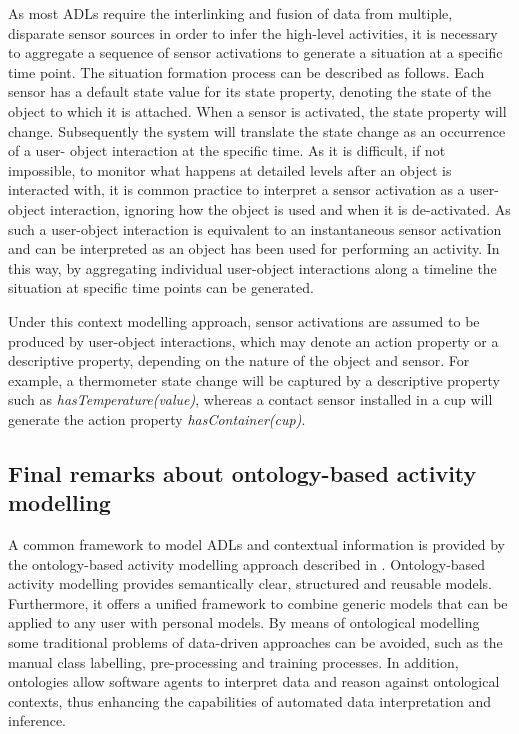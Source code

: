 As most ADLs require the interlinking and fusion of data from multiple, disparate sensor sources in order to infer the high-level activities, it is necessary to aggregate a sequence of sensor activations to generate a situation at a specific time point. The situation formation process can be described as follows. Each sensor has a default state value for its state property, denoting the state of the object to which it is attached. When a sensor is activated, the state property will change. Subsequently the system will translate the state change as an occurrence of a user- object interaction at the specific time. As it is difficult, if not impossible, to monitor what happens at detailed levels after an object is interacted with, it is common practice to interpret a sensor activation as a user-object interaction, ignoring how the object is used and when it is de-activated. As such a user-object interaction is equivalent to an instantaneous sensor activation and can be interpreted as an object has been used for performing an activity. In this way, by aggregating individual user-object interactions along a timeline the situation at specific time points can be generated. 

Under this context modelling approach, sensor activations are assumed to be produced by user-object interactions, which may denote an action property or a descriptive property, depending on the nature of the object and sensor. For example, a thermometer state change will be captured by a descriptive property such as \textit{hasTemperature(value)}, whereas a contact sensor installed in a cup will generate the action property \textit{hasContainer(cup)}. 

\subsection{Final remarks about ontology-based activity modelling}

A common framework to model ADLs and contextual information is provided by the ontology-based activity modelling approach described in \cite{Chen2012a}. Ontology-based activity modelling provides semantically clear, structured and reusable models. Furthermore, it offers a unified framework to combine generic models that can be applied to any user with personal models. By means of ontological modelling some traditional problems of data-driven approaches can be avoided, such as the manual class labelling, pre-processing and training processes. In addition, ontologies allow software agents to interpret data and reason against ontological contexts, thus enhancing the capabilities of automated data interpretation and inference.

